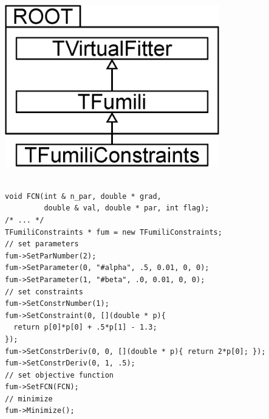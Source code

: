 
\centering\includegraphics[width=0.7\textwidth]{pics/arch1.eps}

\footnotesize
\begin{verbatim}

void FCN(int & n_par, double * grad,
         double & val, double * par, int flag);
/* ... */
TFumiliConstraints * fum = new TFumiliConstraints;
// set parameters
fum->SetParNumber(2);
fum->SetParameter(0, "#alpha", .5, 0.01, 0, 0);
fum->SetParameter(1, "#beta", .0, 0.01, 0, 0);
// set constraints
fum->SetConstrNumber(1);
fum->SetConstraint(0, [](double * p){
  return p[0]*p[0] + .5*p[1] - 1.3;
});
fum->SetConstrDeriv(0, 0, [](double * p){ return 2*p[0]; });
fum->SetConstrDeriv(0, 1, .5);
// set objective function
fum->SetFCN(FCN);
// minimize
fum->Minimize();


\end{verbatim}

